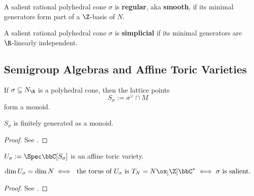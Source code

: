\begin{definition}
  \label{06-reg-cone}

  A salient rational polyhedral cone $\sigma$ is {\bf regular}, aka {\bf smooth}, if its minimal generators form part of a $\Z$-basis of $N$.
\end{definition}


\begin{definition}
  \label{06-simplicial-cone}

  A salient rational polyhedral cone $\sigma$ is {\bf simplicial} if its minimal generators are $\R$-linearly independent.
\end{definition}


\subsection{Semigroup Algebras and Affine Toric Varieties}


\begin{definition}
  \label{07-dual-lat-cone}

  If $\sigma \subseteq N_\R$ is a polyhedral cone, then the lattice points
  \[
    S_\sigma := \sigma^\vee \cap M
  \]
  form a monoid.
\end{definition}


\begin{proposition}
  \label{07-gordan-lemma}

  $S_\sigma$ is finitely generated as a monoid.
\end{proposition}
\begin{proof}

  See \cite{Cox_2011}.
\end{proof}


\begin{definition}
  \label{08-aff-tor-var-rat-polyhedral-cone}

  $U_\sigma := \Spec \bbC[S_\sigma]$ is an affine toric variety.
\end{definition}


\begin{theorem}
  \label{08-dim-aff-tor-var-rat-polyhedral-cone}

  \[
    \dim U_\sigma = \dim N \iff \text{ the torus of $U_\sigma$ is } T_N = N \ox_[\Z] \bbC^* \iff \sigma \text{ is salient}.
  \]
\end{theorem}
\begin{proof}

  See \cite{Cox_2011}.
\end{proof}



